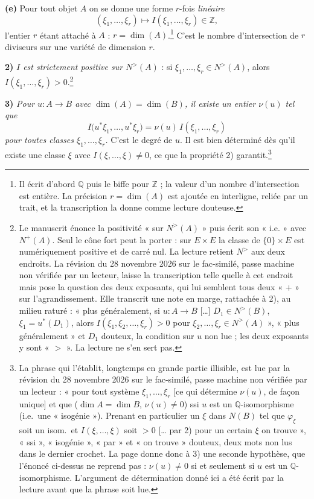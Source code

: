 \documentclass[11pt,a4paper]{article}
\begin{document}
\textbf{(e)} Pour tout objet $A$ on se donne une forme $r$-fois
\emph{linéaire}
\[
  (\xi_{1}, \ldots, \xi_{r}) \longmapsto I(\xi_{1}, \ldots, \xi_{r})
  \in \mathbb{Z},
\]
l'entier $r$ étant attaché à $A$ : $r = \dim(A)$.\footnote{Il écrit d'abord
$\mathbb{Q}$ puis le biffe pour $\mathbb{Z}$ ; la valeur d'un nombre
d'intersection est entière. La précision $r = \dim(A)$ est ajoutée en
interligne, reliée par un trait, et la transcription la donne comme lecture
douteuse.} C'est le nombre d'intersection de $r$ diviseurs sur une variété de
dimension $r$.

\textbf{2)} \emph{$I$ est strictement positive sur $N^{>}(A)$} : si
$\xi_{1}, \ldots, \xi_{r} \in N^{>}(A)$, alors $I(\xi_{1}, \ldots, \xi_{r}) >
0$.\footnote{Le manuscrit énonce la positivité « sur $N^{>}(A)$ » puis écrit
son « i.e. » avec $N^{+}(A)$. Seul le cône fort peut la porter : sur
$E \times E$ la classe de $\{0\} \times E$ est numériquement positive et de
carré nul. La lecture retient $N^{>}$ aux deux endroits. La révision du
28 novembre 2026 sur le fac-similé, passe machine non vérifiée par un lecteur,
laisse la transcription telle quelle à cet endroit mais pose la question des
deux exposants, qui lui semblent tous deux « $+$ » sur l'agrandissement. Elle
transcrit une note en marge, rattachée à 2), au milieu raturé : « plus
généralement, si $u : A \to B$ […] $D_{1} \in N^{>}(B)$,
$\xi_{1} = u^{*}(D_{1})$, alors $I(\xi_{1}, \xi_{2}, \ldots, \xi_{r}) > 0$ pour
$\xi_{2}, \ldots, \xi_{r} \in N^{>}(A)$ », « plus généralement » et $D_{1}$
douteux, la condition sur $u$ non lue ; les deux exposants y sont « $>$ ».
La lecture ne s'en sert pas.}

\textbf{3)} \emph{Pour $u : A \to B$ avec $\dim(A) = \dim(B)$, il existe un
entier $\nu(u)$ tel que}
\[
  I\bigl(u^{*}\xi_{1}, \ldots, u^{*}\xi_{r}\bigr)
  = \nu(u)\, I(\xi_{1}, \ldots, \xi_{r})
\]
\emph{pour toutes classes $\xi_{1}, \ldots, \xi_{r}$.} C'est le degré de $u$.
Il est bien déterminé dès qu'il existe une classe $\xi$ avec
$I(\xi, \ldots, \xi) \neq 0$, ce que la propriété 2) garantit.\footnote{La
phrase qui l'établit, longtemps en grande partie illisible, est lue par la
révision du 28 novembre 2026 sur le fac-similé, passe machine non vérifiée par
un lecteur : « pour tout système $\xi_{1}, \ldots, \xi_{r}$ [ce qui détermine
$\nu(u)$, de façon unique] et que ($\dim A = \dim B$, $\nu(u) \neq 0$) ssi $u$
est un $\mathbb{Q}$-isomorphisme (i.e.\ une « isogénie »). Prenant en
particulier un $\xi$ dans $N(B)$ tel que $\varphi_{\xi}$ soit un isom.\ et
$I(\xi, \ldots, \xi)$ soit $> 0$ [… par 2) pour un certain $\xi$ on trouve »,
« ssi », « isogénie », « par » et « on trouve » douteux, deux mots non lus
dans le dernier crochet. La page donne donc à 3) une seconde hypothèse, que
l'énoncé ci-dessus ne reprend pas : $\nu(u) \neq 0$ si et seulement si $u$ est
un $\mathbb{Q}$-isomorphisme. L'argument de détermination donné ici a été écrit
par la lecture avant que la phrase soit lue.}
\end{document}
